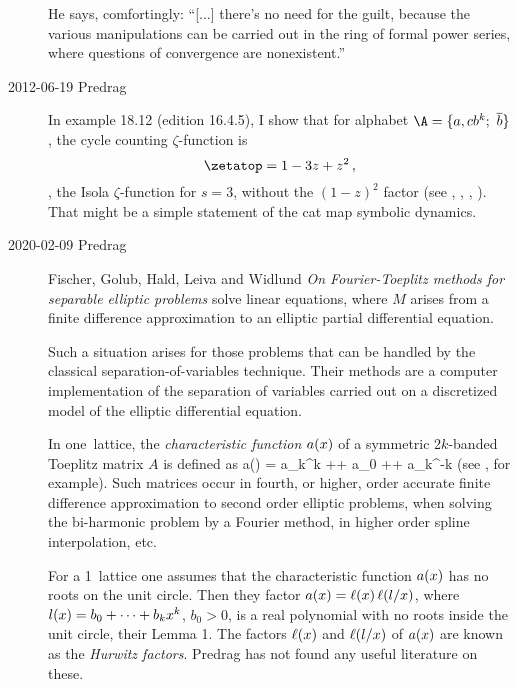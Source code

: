 \begin{description}
He says, comfortingly: ``[...]  there's no need for the guilt, because
the various manipulations can be carried out in the ring of formal power
series, where questions of convergence are nonexistent.''

\item[2012-06-19 Predrag]
In  {example} 18.12 (edition 16.4.5), I show
that for alphabet
\(
    \A=\{a,cb^k; \,\, \overline{b}\}
\)
, the cycle counting {$\zeta$}-function is
\[
\zetatop = 1-3z+z^2
\,,
\]
\ie, the Isola {$\zeta$}-function
for
$s=3$, without the $(1 - z)^2$ factor
(see ,
,
,
). That might be a simple
statement of the cat map symbolic dynamics.


\item[2020-02-09 Predrag]
Fischer, Golub, Hald, Leiva and Widlund
{\em On {Fourier-Toeplitz} methods for separable elliptic problems}
solve linear equations, where $M$ arises from a finite difference
approximation to an elliptic partial differential equation.

Such a situation arises for those problems that can be handled by the
classical separation-of-variables technique. Their methods
are a computer implementation of the
separation of variables carried out on a discretized model of the
elliptic differential equation.

In one\dmn\ lattice, the \emph{characteristic function} $a(x)$ of a symmetric
2$k$-banded Toeplitz matrix $A$ is defined as
\beq
a(\ssp) = a_k\ssp^k +\cdots+ a_0 +\cdots+ a_k\ssp^{-k}
(see , for example).
Such matrices occur in
fourth, or higher, order accurate finite difference approximation to second order
elliptic problems, when solving the bi-harmonic problem by a Fourier method, in
higher order spline interpolation, etc.

For a 1\dmn\ lattice one assumes that the characteristic function
$a(x)$ has no roots on the unit circle. Then they factor
$a(x)=\ell(x)\,\ell(l/x)$, where $l(x)=b_0+\cdots+b_kx^k$,
$b_0 > 0$, is a real polynomial with no roots inside the unit circle,
their Lemma 1. The factors $\ell(x)$ and $\ell(l/x)$ of $a(x)$
are known as the \emph{Hurwitz factors}. Predrag has not found any useful
literature on these.


\end{description}
